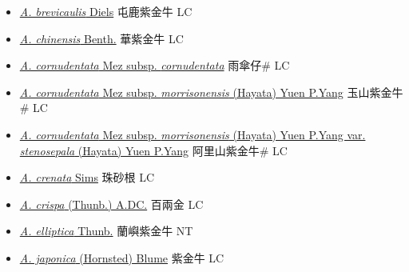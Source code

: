 \begin{itemize}
  \begin{itemize}
        \item[] \href{http://www.theplantlist.org/tpl1.1/search?q=Ardisia+brevicaulis}{\textit{A. brevicaulis} Diels}   屯鹿紫金牛 LC
        \item[] \href{http://www.theplantlist.org/tpl1.1/search?q=Ardisia+chinensis}{\textit{A. chinensis} Benth.}   華紫金牛 LC
        \item[] \href{http://www.theplantlist.org/tpl1.1/search?q=Ardisia+cornudentata+subsp.+cornudentata}{\textit{A. cornudentata} Mez subsp. \textit{cornudentata}}   雨傘仔\# LC
        \item[] \href{http://www.theplantlist.org/tpl1.1/search?q=Ardisia+cornudentata+subsp.+morrisonensis}{\textit{A. cornudentata} Mez subsp. \textit{morrisonensis} (Hayata) Yuen P.Yang}   玉山紫金牛\# LC
        \item[] \href{http://www.theplantlist.org/tpl1.1/search?q=Ardisia+cornudentata+subsp.+morrisonensis+var.+stenosepala}{\textit{A. cornudentata} Mez subsp. \textit{morrisonensis} (Hayata) Yuen P.Yang var. \textit{stenosepala} (Hayata) Yuen P.Yang}   阿里山紫金牛\# LC
        \item[] \href{http://www.theplantlist.org/tpl1.1/search?q=Ardisia+crenata}{\textit{A. crenata} Sims}   珠砂根 LC
        \item[] \href{http://www.theplantlist.org/tpl1.1/search?q=Ardisia+crispa}{\textit{A. crispa} (Thunb.) A.DC.}   百兩金 LC
        \item[] \href{http://www.theplantlist.org/tpl1.1/search?q=Ardisia+elliptica}{\textit{A. elliptica} Thunb.}   蘭嶼紫金牛 NT
        \item[] \href{http://www.theplantlist.org/tpl1.1/search?q=Ardisia+japonica}{\textit{A. japonica} (Hornsted) Blume}   紫金牛 LC

\end{itemize}
\end{itemize}
